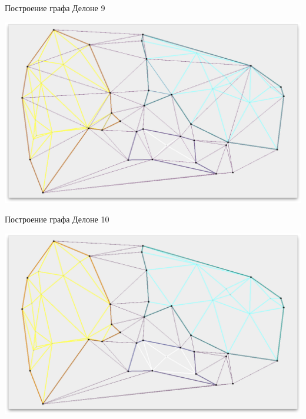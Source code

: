 \documentclass[14pt, fleqn, xcolor={dvipsnames, table}]{beamer}
\begin{document}
        \begin{frame}{Построение графа Делоне 9}
            \begin{center}
                \includegraphics[scale=0.295]{9.png}
            \end{center}             
        \end{frame}    
        
        \begin{frame}{Построение графа Делоне 10}
            \begin{center}
                \includegraphics[scale=0.295]{10.png}
            \end{center}            
        \end{frame}  
       
\end{document}
